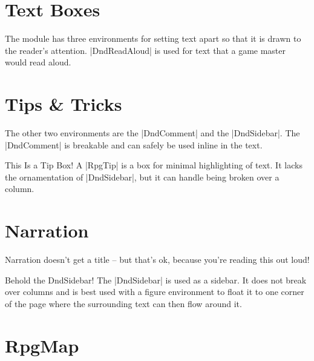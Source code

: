 	\section{Text Boxes}

	The module has three environments for setting text apart so that it is drawn to the reader's attention. |DndReadAloud| is used for text that a game master would read aloud.
	\section{Tips \& Tricks}
	The other two environments are the |DndComment| and the |DndSidebar|. The |DndComment| is breakable and can safely be used inline in the text.

	\begin{RpgTip}{This Is a Tip Box!}
	A |RpgTip| is a box for minimal highlighting of text. It lacks the ornamentation of |DndSidebar|, but it can handle being broken over a column.
	\end{RpgTip}



	\section{Narration}

	\begin{RpgNarration}
		Narration doesn't get a title -- but that's ok, because you're reading this out loud!
	\end{RpgNarration}

	\begin{RpgSidebar}[]{Behold the DndSidebar!}
  The |DndSidebar| is used as a sidebar. It does not break over columns and is best used with a figure environment to float it to one corner of the page where the surrounding text can then flow around it.
\end{RpgSidebar}
		\section{RpgMap}

